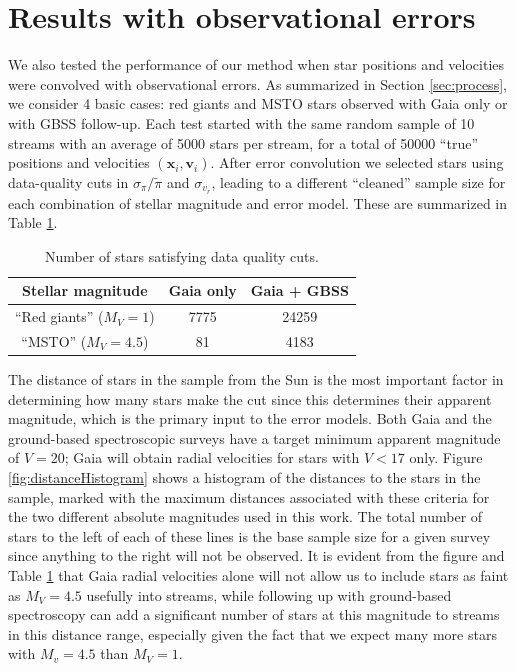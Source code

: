 \documentclass{emulateapj}
\begin{document}
\section{Results with observational errors} 

We also tested the performance of our method when star positions and velocities were convolved with observational errors. As summarized in Section \ref{sec:process}, we consider 4 basic cases: red giants and MSTO stars observed with Gaia only or with GBSS follow-up. Each test started with the same random sample of 10 streams with an average of 5000 stars per stream, for a total of 50000 ``true'' positions and velocities $(\mathbf{x}_i,\mathbf{v}_i)$. After error convolution we selected stars using data-quality cuts in $\sigma_\pi/\tilde{\pi}$ and $\sigma_{v_r}$, leading to a different ``cleaned'' sample size for each combination of stellar magnitude and error model. These are summarized in Table \ref{tbl:cleanSampleSizes}. 

\begin{table}
\caption{Number of stars satisfying data quality cuts.}
 \begin{tabular}{ccc}
 Stellar magnitude & Gaia only & Gaia + GBSS \\
\hline
``Red giants'' ($M_V = 1$) & 7775 & 24259 \\
``MSTO'' ($M_V = 4.5$) & 81 & 4183 \\
\end{tabular}
\label{tbl:cleanSampleSizes}
\end{table}


The distance of stars in the sample from the Sun is the most important factor in determining how many stars make the cut since this determines their apparent magnitude, which is the primary input to the error models. Both Gaia and the ground-based spectroscopic surveys have a target minimum apparent magnitude of $V=20$; Gaia will obtain radial velocities for stars with $V<17$ only. Figure \ref{fig:distanceHistogram} shows a histogram of the distances to the stars in the sample, marked with the maximum distances associated with these criteria for the two different absolute magnitudes used in this work. The total number of stars to the left of each of these lines is the base sample size for a given survey since anything to the right will not be observed. It is evident from the figure and Table \ref{tbl:cleanSampleSizes} that Gaia radial velocities alone will not allow us to include stars as faint as $M_V=4.5$ usefully into streams, while following up with ground-based spectroscopy can add a significant number of stars at this magnitude to streams in this distance range, especially given the fact that we expect many more stars with $M_v=4.5$ than  $M_V=1$. 
\end{document}
